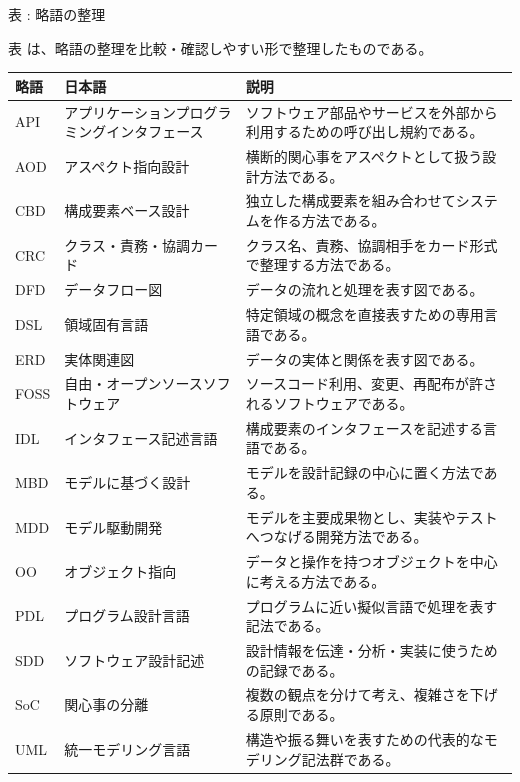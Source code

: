 \par\smallskip\noindent{}\label{tab:ch03-02}表 \thetable: 略語の整理\par\smallskip
表 \thetable は、略語の整理を比較・確認しやすい形で整理したものである。\par\smallskip
\begin{tabularx}{\linewidth}{L{18mm}L{43mm}Y}
\toprule
略語 & 日本語 & 説明 \\
\midrule
API & アプリケーションプログラミングインタフェース & ソフトウェア部品やサービスを外部から利用するための呼び出し規約である。 \\
AOD & アスペクト指向設計 & 横断的関心事をアスペクトとして扱う設計方法である。 \\
CBD & 構成要素ベース設計 & 独立した構成要素を組み合わせてシステムを作る方法である。 \\
CRC & クラス・責務・協調カード & クラス名、責務、協調相手をカード形式で整理する方法である。 \\
DFD & データフロー図 & データの流れと処理を表す図である。 \\
DSL & 領域固有言語 & 特定領域の概念を直接表すための専用言語である。 \\
ERD & 実体関連図 & データの実体と関係を表す図である。 \\
FOSS & 自由・オープンソースソフトウェア & ソースコード利用、変更、再配布が許されるソフトウェアである。 \\
IDL & インタフェース記述言語 & 構成要素のインタフェースを記述する言語である。 \\
MBD & モデルに基づく設計 & モデルを設計記録の中心に置く方法である。 \\
MDD & モデル駆動開発 & モデルを主要成果物とし、実装やテストへつなげる開発方法である。 \\
OO & オブジェクト指向 & データと操作を持つオブジェクトを中心に考える方法である。 \\
PDL & プログラム設計言語 & プログラムに近い擬似言語で処理を表す記法である。 \\
SDD & ソフトウェア設計記述 & 設計情報を伝達・分析・実装に使うための記録である。 \\
SoC & 関心事の分離 & 複数の観点を分けて考え、複雑さを下げる原則である。 \\
UML & 統一モデリング言語 & 構造や振る舞いを表すための代表的なモデリング記法群である。 \\
\bottomrule
\end{tabularx}

